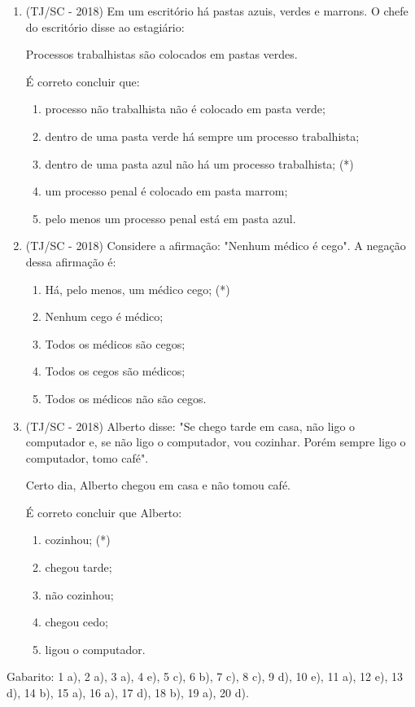 \begin{enumerate}
  \item (TJ/SC - 2018) Em um escritório há pastas azuis, verdes e marrons. O chefe do escritório disse ao estagiário:

  Processos trabalhistas são colocados em pastas verdes.

  É correto concluir que:
  \begin{enumerate}
  \item processo não trabalhista não é colocado em pasta verde;
  \item dentro de uma pasta verde há sempre um processo trabalhista;
  \item dentro de uma pasta azul não há um processo trabalhista; (*)
  \item um processo penal é colocado em pasta marrom;
  \item pelo menos um processo penal está em pasta azul.
 \end{enumerate}

  \item (TJ/SC - 2018) Considere a afirmação: "Nenhum médico é cego". A negação dessa afirmação é:
  \begin{enumerate}
  \item Há, pelo menos, um médico cego; (*)
  \item Nenhum cego é médico;
  \item Todos os médicos são cegos;
  \item Todos os cegos são médicos;
  \item Todos os médicos não são cegos.
 \end{enumerate}

 \item (TJ/SC - 2018) Alberto disse: "Se chego tarde em casa, não ligo o computador e, se não ligo o computador, vou cozinhar. Porém sempre ligo o computador, tomo café".

  Certo dia, Alberto chegou em casa e não tomou café.

  É correto concluir que Alberto:
  \begin{enumerate}
  \item cozinhou; (*)
  \item chegou tarde;
  \item não cozinhou;
  \item chegou cedo;
  \item ligou o computador.
 \end{enumerate}

\end{enumerate}

Gabarito: 1 a), 2 a), 3 a), 4 e), 5 c), 6 b), 7 c), 8 c), 9 d), 10 e), 11 a), 12 e), 13 d), 14 b), 15 a), 16 a), 17 d), 18 b), 19 a), 20 d).

